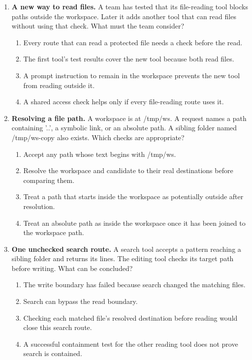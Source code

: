 \begin{enumerate}[start=31,itemsep=0.7\baselineskip]
\item\label{exercise:38} \begin{minipage}[t]{\linewidth}
\textbf{A new way to read files.} A team has tested that its file-reading tool blocks paths outside the workspace. Later it adds another tool that can read files without using that check. What must the team consider?
\begin{enumerate}[label=\textnormal{(\Alph*)},leftmargin=*,itemsep=0pt]
\item Every route that can read a protected file needs a check before the read.
\item The first tool's test results cover the new tool because both read files.
\item A prompt instruction to remain in the workspace prevents the new tool from reading outside it.
\item A shared access check helps only if every file-reading route uses it.
\end{enumerate}
\end{minipage}

\item\label{exercise:39} \begin{minipage}[t]{\linewidth}
\textbf{Resolving a file path.} A workspace is at /tmp/ws. A request names a path containing '..', a symbolic link, or an absolute path. A sibling folder named /tmp/ws-copy also exists. Which checks are appropriate?
\begin{enumerate}[label=\textnormal{(\Alph*)},leftmargin=*,itemsep=0pt]
\item Accept any path whose text begins with /tmp/ws.
\item Resolve the workspace and candidate to their real destinations before comparing them.
\item Treat a path that starts inside the workspace as potentially outside after resolution.
\item Treat an absolute path as inside the workspace once it has been joined to the workspace path.
\end{enumerate}
\end{minipage}

\item\label{exercise:40} \begin{minipage}[t]{\linewidth}
\textbf{One unchecked search route.} A search tool accepts a pattern reaching a sibling folder and returns its lines. The editing tool checks its target path before writing. What can be concluded?
\begin{enumerate}[label=\textnormal{(\Alph*)},leftmargin=*,itemsep=0pt]
\item The write boundary has failed because search changed the matching files.
\item Search can bypass the read boundary.
\item Checking each matched file's resolved destination before reading would close this search route.
\item A successful containment test for the other reading tool does not prove search is contained.
\end{enumerate}
\end{minipage}


\end{enumerate}

